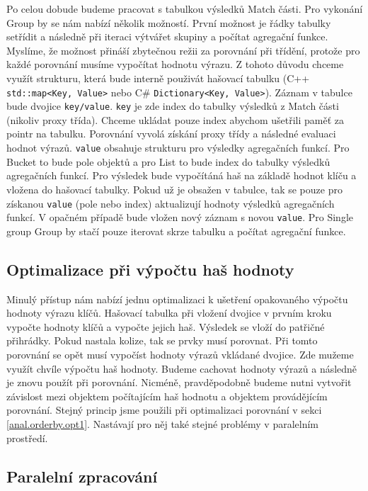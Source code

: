 Po celou dobude budeme pracovat s tabulkou výsledků Match části.
Pro vykonání Group by se nám nabízí několik možností.
První možnost je řádky tabulky setřídit a následně při iteraci výtvářet skupiny a počítat agregační funkce.
Myslíme, že možnost přináší zbytečnou režii za porovnání při třídění, protože pro každé porovnání musíme vypočítat hodnotu výrazu.
Z tohoto důvodu chceme využít strukturu, která bude interně použivát hašovací tabulku (C++ \texttt{std::map<Key, Value>} nebo C\#  \texttt{Dictionary<Key, Value>}).
Záznam v tabulce bude dvojice \texttt{key/value}. 
\texttt{key} je zde index do tabulky výsledků z Match části (nikoliv proxy třída).
Chceme ukládat pouze index abychom ušetřili paměť za pointr na tabulku.
Porovnání vyvolá získání proxy třídy a následné evaluaci hodnot výrazů.
\texttt{value} obsahuje strukturu pro výsledky agregačních funkcí.
Pro Bucket to bude pole objektů a pro List to bude index do tabulky výsledků agregačních funkcí.
Pro výsledek bude vypočítáná haš na základě hodnot klíču a vložena do hašovací tabulky.
Pokud už je obsažen v tabulce, tak se pouze pro získanou \texttt{value} (pole nebo index) aktualizují hodnoty výsledků agregačních funkcí.
V opačném případě bude vložen nový záznam s novou \texttt{value}.
Pro Single group Group by stačí pouze iterovat skrze tabulku a počítat agregační funkce.

\subsection{Optimalizace při výpočtu haš hodnoty} \label{anal.groupby.opt1}

Minulý přístup nám nabízí jednu optimalizaci k ušetření opakovaného výpočtu hodnoty výrazu klíčů.
Hašovací tabulka při vložení dvojice v prvním kroku vypočte hodnoty klíčů a vypočte jejich haš.
Výsledek se vloží do patřičné přihrádky.
Pokud nastala kolize, tak se prvky musí porovnat.
Při tomto porovnání se opět musí vypočíst hodnoty výrazů vkládané dvojice.
Zde mužeme využít chvíle výpočtu haš hodnoty.
Budeme cachovat hodnoty výrazů a následně je znovu použít při porovnání.
Nicméně, pravděpodobně budeme nutni vytvořit závislost mezi objektem počítajícím haš hodnotu a objektem provádějícím porovnání.
Stejný princip jsme použili při optimalizaci porovnání v sekci \ref{anal.orderby.opt1}.
Nastávají pro něj také stejné problémy v paralelním prostředí.

\subsection{Paralelní zpracování}

